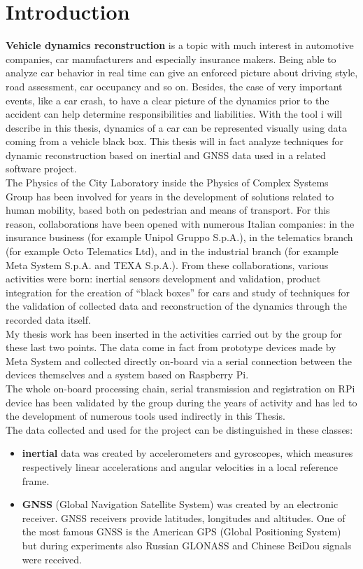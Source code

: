 \chapter{Introduction}
\label{chap:intro}

\textbf{Vehicle dynamics reconstruction} is a topic with much interest in automotive companies, car manufacturers and especially insurance makers.
Being able to analyze car behavior in real time can give an enforced picture about driving style, road assessment, car occupancy and so on. Besides, the case of very important events, like a car crash, to have a clear picture of the dynamics prior to the accident can help determine responsibilities and liabilities.
With the tool i will describe in this thesis, dynamics of a car can be represented visually using data coming from a vehicle black box.
This thesis will in fact analyze techniques for dynamic reconstruction based on inertial and GNSS data used in a related software project. \\
The Physics of the City Laboratory inside the Physics of Complex Systems Group has been involved for years in the development of solutions related to human mobility, based both on pedestrian and means of transport. For this reason, collaborations have been opened with numerous Italian companies: in the insurance business (for example Unipol Gruppo S.p.A.), in the telematics branch (for example Octo Telematics Ltd), and in the industrial branch (for example Meta System S.p.A. and TEXA S.p.A.). From these collaborations, various activities were born: inertial sensors development and validation, product integration for the creation of ``black boxes'' for cars and study of techniques for the validation of collected data and reconstruction of the dynamics through the recorded data itself. \\
My thesis work has been inserted in the activities carried out by the group for these last two points. The data come in fact from prototype devices made by Meta System and collected directly on-board via a serial connection between the devices themselves and a system based on Raspberry Pi. \\
The whole on-board processing chain, serial transmission and registration on RPi device has been validated by the group during the years of activity and has led to the development of numerous tools used indirectly in this Thesis. 
\\
The data collected and used for the project can be distinguished in these classes:
\begin{itemize}
\item \textbf{inertial} data was created by accelerometers and gyroscopes, which measures respectively linear accelerations and angular velocities in a local reference frame. 
\item \textbf{GNSS} (Global Navigation Satellite System) was created by an electronic receiver. GNSS receivers provide latitudes, longitudes and altitudes. One of the most famous GNSS is the American GPS (Global Positioning System) but during experiments also Russian GLONASS and Chinese BeiDou signals were received. 
\end{itemize}
